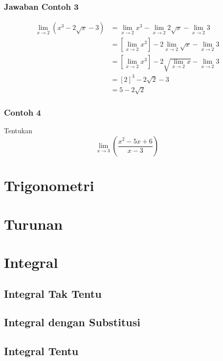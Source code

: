 \documentclass[pdflatex,compress,mathserif]{beamer}
\begin{document}
		\begin{frame}
			\frametitle{Jawaban Contoh 3}
			\begin{align*}
				\lim\limits_{x \rightarrow 2} \left( x^3 - 2\sqrt{x} - 3 \right) & = \lim\limits_{x \rightarrow 2} x^3 - \lim\limits_{x \rightarrow 2} 2\sqrt{x} - \lim\limits_{x \rightarrow 2} 3 \\
				& = \left[\lim\limits_{x \rightarrow 2} x^3\right] - 2\lim\limits_{x \rightarrow 2} \sqrt{x} - \lim\limits_{x \rightarrow 2} 3 \\
				& = \left[\lim\limits_{x \rightarrow 2} x^3\right] - 2\sqrt{\lim\limits_{x \rightarrow 2} x} - \lim\limits_{x \rightarrow 2} 3 \\
				& = [2]^3 - 2\sqrt{2} - 3 \\
				& = 5 - 2\sqrt{2}
			\end{align*}
		\end{frame}
	
		\begin{frame}
			\frametitle{Contoh 4}
			Tentukan
			\begin{equation*}
				\lim\limits_{x \rightarrow 3} \left( \frac{x^2 - 5x + 6}{x - 3} \right)
			\end{equation*}
		\end{frame}

\section{Trigonometri}

\section{Turunan}

\section{Integral}

	\subsection{Integral Tak Tentu}

	\subsection{Integral dengan Substitusi}
	
	\subsection{Integral Tentu}
\end{document}
